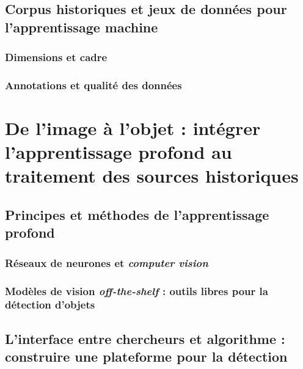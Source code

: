 \documentclass[a4paper,12pt,twoside]{book}
\newcommand{\clearemptydoublepage}{\newpage{\pagestyle{empty}\cleardoublepage}}
\begin{document}
        \clearemptydoublepage
        
        \chapter{Corpus historiques et jeux de données pour l’apprentissage machine}
                \section{Dimensions et cadre}
                    
            
                \section{Annotations et qualité des données}
                    
                    
        \clearemptydoublepage


    \part{De l’image à l’objet : intégrer l’apprentissage profond au traitement des sources historiques}
        \chapter{Principes et méthodes de l’apprentissage profond}
                \section{Réseaux de neurones et \textit{computer vision}}
                    
            
                \section{Modèles de vision \textit{off-the-shelf} : outils libres pour la détection d’objets}
                    
            
        \clearemptydoublepage
        
        \chapter{L’interface entre chercheurs et algorithme : construire une plateforme pour la détection}
\end{document}
